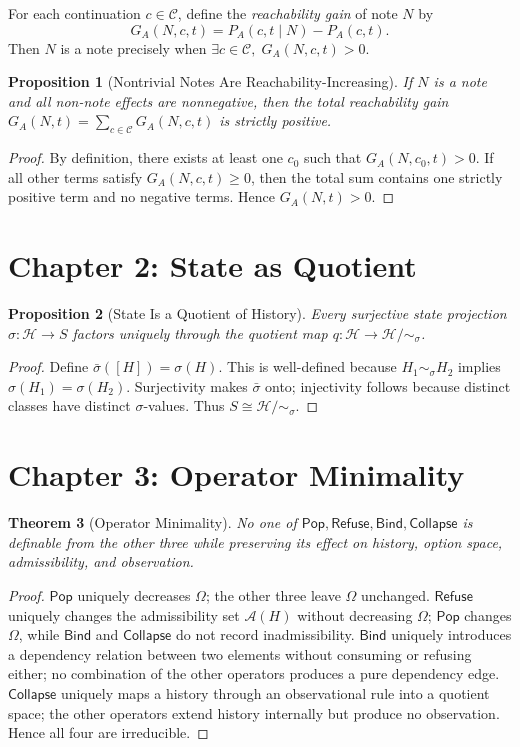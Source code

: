 \documentclass[12pt, a4paper, openany]{book}
\theoremstyle{plain}
\newtheorem{theorem}{Theorem}[chapter]
\newtheorem{proposition}[theorem]{Proposition}
\theoremstyle{definition}
\theoremstyle{remark}
\newcommand{\Pop}{\mathsf{Pop}}
\newcommand{\Refuse}{\mathsf{Refuse}}
\newcommand{\Bind}{\mathsf{Bind}}
\newcommand{\Collapse}{\mathsf{Collapse}}
\newcommand{\calH}{\mathcal{H}}
\newcommand{\calC}{\mathcal{C}}
\newcommand{\calA}{\mathcal{A}}
\begin{document}
For each continuation $c \in \calC$, define the \emph{reachability gain} of note
$N$ by
\[
G_A(N, c, t) = P_A(c, t \mid N) - P_A(c, t).
\]
Then $N$ is a note precisely when $\exists c \in \calC,\; G_A(N, c, t) > 0$.

\begin{proposition}[Nontrivial Notes Are Reachability-Increasing]
If $N$ is a note and all non-note effects are nonnegative, then the total
reachability gain
$G_A(N, t) = \sum_{c \in \calC} G_A(N, c, t)$
is strictly positive.
\end{proposition}

\begin{proof}
By definition, there exists at least one $c_0$ such that $G_A(N, c_0, t) > 0$.
If all other terms satisfy $G_A(N, c, t) \geq 0$, then the total sum contains
one strictly positive term and no negative terms. Hence $G_A(N, t) > 0$.
\end{proof}

\section{Chapter 2: State as Quotient}

\begin{proposition}[State Is a Quotient of History]
Every surjective state projection $\sigma : \calH \to S$ factors uniquely through
the quotient map $q : \calH \to \calH/{\sim_\sigma}$.
\end{proposition}

\begin{proof}
Define $\bar\sigma([H]) = \sigma(H)$. This is well-defined because
$H_1 \sim_\sigma H_2$ implies $\sigma(H_1) = \sigma(H_2)$. Surjectivity makes
$\bar\sigma$ onto; injectivity follows because distinct classes have distinct
$\sigma$-values. Thus $S \cong \calH/{\sim_\sigma}$.
\end{proof}

\section{Chapter 3: Operator Minimality}

\begin{theorem}[Operator Minimality]
No one of $\Pop, \Refuse, \Bind, \Collapse$ is definable from the other three
while preserving its effect on history, option space, admissibility, and
observation.
\end{theorem}

\begin{proof}
$\Pop$ uniquely decreases $\Omega$; the other three leave $\Omega$ unchanged.
$\Refuse$ uniquely changes the admissibility set $\calA(H)$ without decreasing
$\Omega$; $\Pop$ changes $\Omega$, while $\Bind$ and $\Collapse$ do not record
inadmissibility. $\Bind$ uniquely introduces a dependency relation between two
elements without consuming or refusing either; no combination of the other
operators produces a pure dependency edge. $\Collapse$ uniquely maps a history
through an observational rule into a quotient space; the other operators extend
history internally but produce no observation. Hence all four are irreducible.
\end{proof}
\end{document}
